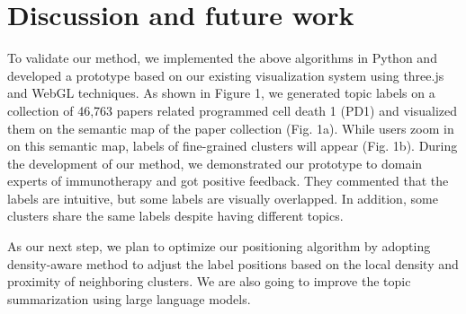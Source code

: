 \documentclass{vgtc}                          %
\begin{document}
\section{Discussion and future work}

To validate our method, we implemented the above algorithms in Python and developed a prototype based on our existing visualization system using three.js and WebGL techniques. As shown in Figure 1, we generated topic labels on a collection of 46,763 papers related programmed cell death 1 (PD1) and visualized them on the semantic map of the paper collection (Fig. 1a). While users zoom in on this semantic map, labels of fine-grained clusters will appear (Fig. 1b). During the development of our method, we demonstrated our prototype to domain experts of immunotherapy and got positive feedback. They commented that the labels are intuitive, but some labels are visually overlapped. In addition, some clusters share the same labels despite having different topics. 

As our next step, we plan to optimize our positioning algorithm by adopting density-aware method to adjust the label positions based on the local density and proximity of neighboring clusters. We are also going to improve the topic summarization using large language models. 


\newpage 

%

%
%
%


\end{document}
